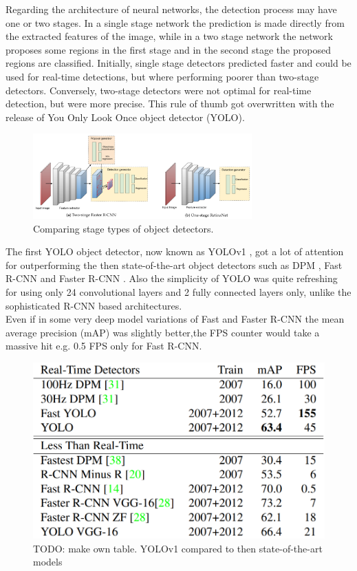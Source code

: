 Regarding the architecture of neural networks, the detection process may have one or two stages. In a single stage network the prediction is made directly from the extracted features of the image, while in a two stage network the network proposes some regions in the first stage and in the second stage the proposed regions are classified. Initially, single stage detectors predicted faster and could be used for real-time detections, but where performing poorer than two-stage detectors. Conversely, two-stage detectors were not optimal for real-time detection, but were more precise. This rule of thumb got overwritten with the release of You Only Look Once object detector (YOLO).

\begin{figure}[!h]
\centering
\includegraphics[width=0.75\textwidth]{images/single_stage_vs_two_stage}
\caption{Comparing stage types of object detectors.}
\end{figure}



The first YOLO object detector, now known as YOLOv1 \cite{yolov1_paper}, got a lot of attention for outperforming the then state-of-the-art object detectors such as DPM \cite{dpm_paper}, Fast R-CNN \cite{fast_rcnn_paper} and Faster R-CNN \cite{faster_rcnn_paper}. Also the simplicity of YOLO was quite refreshing for using only 24 convolutional layers and 2 fully connected layers only, unlike the sophisticated R-CNN based architectures. \\
Even if in some very deep model variations of Fast and Faster R-CNN the mean average precision (mAP) was slightly better,the FPS counter would take a massive hit e.g. 0.5 FPS only for Fast R-CNN. \\

\begin{figure}[!h]
  \centering
  \includegraphics[width=0.75\linewidth]{images/yolo_images/compare_yolov1}
  \caption{TODO: make own table. YOLOv1 compared to then state-of-the-art models \cite{yolov1_paper}}
\end{figure}


